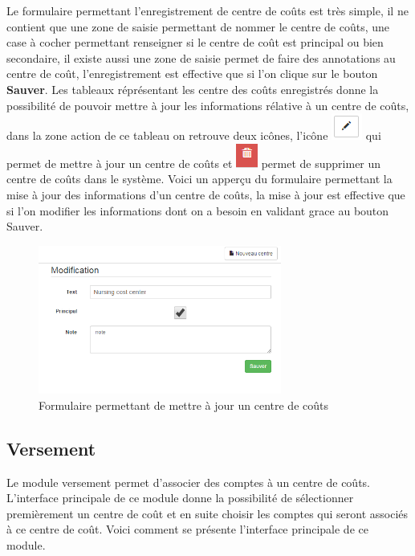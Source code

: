 \documentclass[12pt,a4paper]{report}
\begin{document}
Le formulaire permettant l'enregistrement  de centre de coûts est très simple, il ne contient que une zone de saisie permettant de nommer le centre de coûts, une case à cocher permettant renseigner si le centre de coût est principal ou bien secondaire, il existe aussi une zone de saisie permet de faire des annotations au centre de coût, l'enregistrement est effective que si l'on clique sur le bouton \textbf{Sauver}. 
\newpage
Les tableaux réprésentant les centre des coûts enregistrés donne la possibilité de pouvoir mettre à jour les informations rélative à un centre de coûts, dans la zone action de ce tableau on retrouve deux icônes, l'icône \includegraphics[scale=0.7]{pic/EditBlack.png} qui permet de mettre à jour un centre de coûts et \includegraphics[scale=0.7]{pic/RecycleRed.png} permet de supprimer un centre de coûts dans le système.
Voici un apperçu du formulaire permettant la mise à jour des informations d'un centre de coûts, la mise à jour est effective que si l'on modifier les informations dont on a besoin en validant grace au bouton Sauver. 

\begin{figure}[h]
\begin{center}
\includegraphics[width=8cm]{pic/ModCostCenter.png}
\end{center}
\caption{Formulaire permettant de mettre à jour un centre de coûts}
\label{Formulaire permettant de mettre à jour un centre de coûts}
\end{figure} 
\newpage
\subsection{Versement}
Le module versement permet d'associer des comptes à un centre de coûts. L'interface principale de ce module donne la possibilité de sélectionner premièrement un centre de coût et en suite choisir les comptes qui seront associés à ce centre de coût. Voici comment se présente l'interface principale de ce module.
\end{document}
